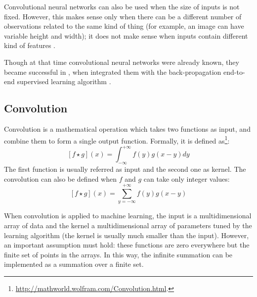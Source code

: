         Convolutional neural networks can also be used when the size of inputs is not fixed. However, this makes sense only when there can be a different number of observations related to the same kind of thing (for example, an image can have variable height and width); it does not make sense when inputs contain different kind of features \cite[362]{Goodfellow}.
        
        Though at that time convolutional neural networks were already known, they became successful in \citeyear{LeCun}, when \citeauthor{LeCun} integrated them with the back-propagation end-to-end supervised learning algorithm \cite{LeCun}.
        \subsection{Convolution}
            Convolution is a mathematical operation which takes two functions as input, and combine them to form a single output function. Formally, it is defined as\footnote{\url{http://mathworld.wolfram.com/Convolution.html}.}:
            \[\left[f \star g\right]\left(x\right) = \int_{-\infty}^{+\infty}f\left(y\right)g\left(x-y\right)dy\]
            The first function is usually referred as input and the second one as kernel. The convolution can also be defined when \(f\) and \(g\) can take only integer values:
            \[\left[f \star g\right]\left(x\right) = \sum_{y=-\infty}^{+\infty}f\left(y\right)g\left(x-y\right)\]
            
            When convolution is applied to machine learning, the input is a multidimensional array of data and the kernel a multidimensional array of parameters tuned by the learning algorithm \cite[332]{Goodfellow} (the kernel is usually much smaller than the input). However, an important assumption must hold: these functions are zero everywhere but the finite set of points in the arrays. In this way, the infinite summation can be implemented as a summation over a finite set.
            
